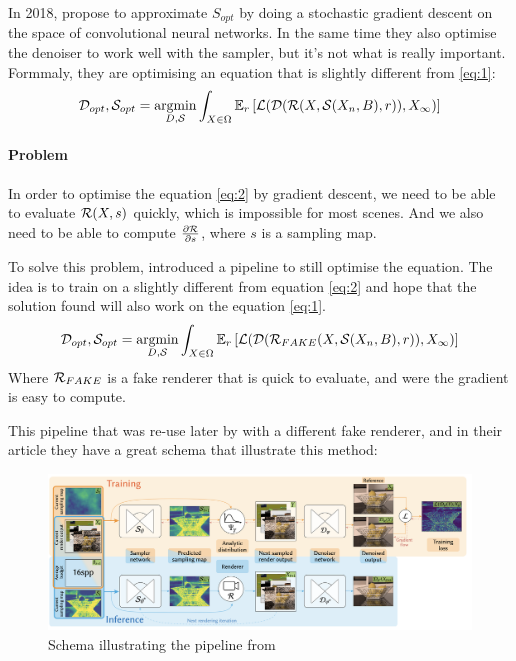 \documentclass{classeENS}
\begin{document}
In 2018, \cite{kuznetsov2018deep} propose to approximate $S_{opt}$ by doing a stochastic
gradient descent on the space of convolutional neural networks. In the same time they also 
optimise the denoiser to work well with the sampler, but it's not what is really important. 
Formmaly, they are optimising an equation that is slightly different from \ref{eq:1}:
\begin{equation}
    \label{eq:2}
    \mathcal D_{opt}, \mathcal S_{opt} = \operatorname*{argmin}_{D, \mathcal S} \int_{X\in\Omega} \mathbb E_r \left [ \mathcal L (\mathcal D (\mathcal R(X, \mathcal S(X_n, B), r)), X_\infty) \right ]
\end{equation}

\paragraph*{Problem} In order to optimise the equation \ref{eq:2} by gradient descent,
we need to be able to evaluate $\mathcal R(X,s)$ quickly, which is impossible for most scenes.
And we also need to be able to compute $\frac{\partial \mathcal R}{\partial s}$, where $s$ is a 
sampling map.


\par To solve this problem, \cite{kuznetsov2018deep} introduced a pipeline to still optimise
the equation. The idea is to train on a slightly different from equation \ref{eq:2} and hope 
that the solution found will also work on the equation \ref{eq:1}.
\begin{equation}
    \label{eq:3}
    \mathcal D_{opt}, \mathcal S_{opt} = \operatorname*{argmin}_{D, \mathcal S} \int_{X\in\Omega} \mathbb E_r \left [ \mathcal L (\mathcal D (\mathcal R_{FAKE}(X, \mathcal S(X_n, B), r)), X_\infty) \right ]
\end{equation}
Where $\mathcal R_{FAKE}$ is a fake renderer that is quick to evaluate, and were the gradient is easy
to compute.

\par This pipeline that was re-use later by \cite{10.1145/3550454.3555515} with a different fake 
renderer, and in their article they have a great schema that illustrate this method:

\begin{figure}[H]
    \centering
    \caption{Schema illustrating the pipeline from \cite{10.1145/3550454.3555515}}
    \includegraphics[width=160mm]{image/pipeline.png}
\end{figure}
\end{document}
